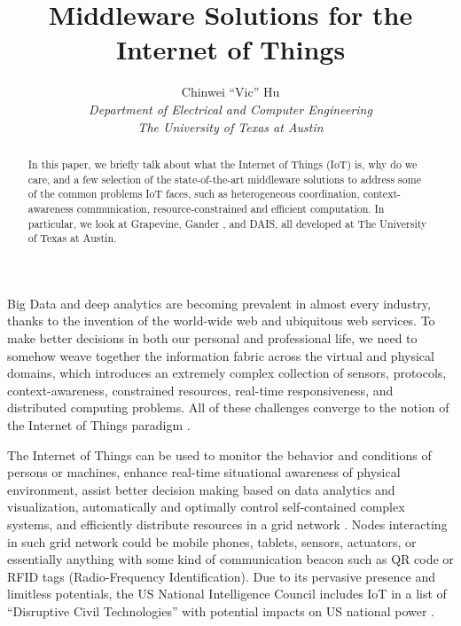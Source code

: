 \documentclass[11pt,onecolumn]{article}
\begin{document}
%
\title{Middleware Solutions for the Internet of Things}



\author{
Chinwei ``Vic'' Hu\\
{\small \textit{Department of Electrical and Computer Engineering} }\\
{\small \textit{The University of Texas at Austin}}
}


\maketitle


\begin{abstract}
In this paper, we briefly talk about what the Internet of Things (IoT) is, why do we care, and a few selection of the state-of-the-art middleware solutions to address some of the common problems IoT faces, such as heterogeneous coordination, context-awareness communication, resource-constrained and efficient computation. In particular, we look at Grapevine\cite{grapevine}, Gander \cite{michel2013gander}, and DAIS\cite{dais}, all developed at The University of Texas at Austin.
\end{abstract}

Big Data \cite{manyika2011big} and deep analytics are becoming prevalent in almost every industry, thanks to the invention of the world-wide web \cite{berners1994world} and ubiquitous web services. To make better decisions in both our personal and professional life, we need to somehow weave together the information fabric across the virtual and physical domains, which introduces an extremely complex collection of sensors, protocols, context-awareness, constrained resources, real-time responsiveness, and distributed computing problems. All of these challenges converge to the notion of the Internet of Things paradigm \cite{atzori2010internet}.

The Internet of Things can be used to monitor the behavior and conditions of persons or machines, enhance real-time situational awareness of physical environment, assist better decision making based on data analytics and visualization, automatically and optimally control self-contained complex systems, and efficiently distribute resources in a grid network \cite{chui2010internet}. Nodes interacting in such grid network could be mobile phones, tablets, sensors, actuators, or essentially anything with some kind of communication beacon such as QR code or RFID tags \cite{welbourne2009building}(Radio-Frequency Identification). Due to its pervasive presence and limitless potentials, the US National Intelligence Council includes IoT in a list of ``Disruptive Civil Technologies'' with potential impacts on US national power \cite{officialdisruptive}.
\end{document}
